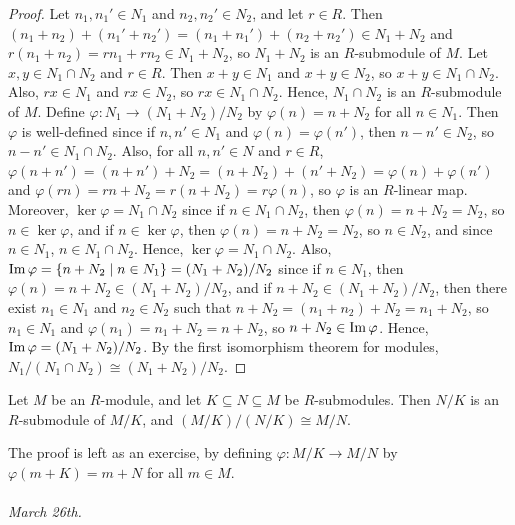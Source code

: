 \begin{proof}
    Let $n_{1},n_{1}' \in N_{1}$ and $n_{2},n_{2}' \in N_{2}$, and let $r \in R$. Then $(n_{1}+n_{2}) + (n_{1}'+n_{2}') = (n_{1}+n_{1}') + (n_{2}+n_{2}') \in N_{1} + N_{2}$ and $r(n_{1}+n_{2}) = rn_{1} + rn_{2} \in N_{1} + N_{2}$, so $N_{1} + N_{2}$ is an $R$-submodule of $M$. Let $x,y \in N_{1} \cap N_{2}$ and $r \in R$. Then $x+y \in N_{1}$ and $x+y \in N_{2}$, so $x+y \in N_{1} \cap N_{2}$. Also, $rx \in N_{1}$ and $rx \in N_{2}$, so $rx \in N_{1} \cap N_{2}$. Hence, $N_{1} \cap N_{2}$ is an $R$-submodule of $M$. Define $\varphi : N_{1} \to (N_{1}+N_{2})/N_{2}$ by $\varphi(n) = n + N_{2}$ for all $n \in N_{1}$. Then $\varphi$ is well-defined since if $n,n' \in N_{1}$ and $\varphi(n) = \varphi(n')$, then $n - n' \in N_{2}$, so $n - n' \in N_{1} \cap N_{2}$. Also, for all $n,n' \in N$ and $r \in R$, $\varphi(n+n') = (n+n') + N_{2} = (n+N_{2}) + (n'+N_{2}) = \varphi(n) + \varphi(n')$ and $\varphi(rn) = rn + N_{2} = r(n+N_{2}) = r\varphi(n)$, so $\varphi$ is an $R$-linear map. Moreover, $\ker \varphi = N_{1} \cap N_{2}$ since if $n \in N_{1} \cap N_{2}$, then $\varphi(n) = n + N_{2} = N_{2}$, so $n \in \ker \varphi$, and if $n \in \ker \varphi$, then $\varphi(n) = n + N_{2} = N_{2}$, so $n \in N_{2}$, and since $n \in N_{1}$, $n \in N_{1} \cap N_{2}$. Hence, $\ker \varphi = N_{1} \cap N_{2}$. Also, $\operatorname{Im} \varphi = \{n + N_{2} \mid n \in N_{1}\} = (N_{1}+N_{2})/N_{2}$ since if $n \in N_{1}$, then $\varphi(n) = n + N_{2} \in (N_{1}+N_{2})/N_{2}$, and if $n + N_{2} \in (N_{1}+N_{2})/N_{2}$, then there exist $n_{1} \in N_{1}$ and $n_{2} \in N_{2}$ such that $n + N_{2} = (n_{1}+n_{2}) + N_{2} = n_{1} + N_{2}$, so $n_{1} \in N_{1}$ and $\varphi(n_{1}) = n_{1} + N_{2} = n + N_{2}$, so $n + N_{2} \in \operatorname{Im} \varphi$. Hence, $\operatorname{Im} \varphi = (N_{1}+N_{2})/N_{2}$. By the first isomorphism theorem for modules, $N_{1}/(N_{1} \cap N_{2}) \cong (N_{1}+N_{2})/N_{2}$.
\end{proof}


\begin{theorem}
    Let $M$ be an $R$-module, and let $K \subseteq N \subseteq M$ be $R$-submodules. Then $N/K$ is an $R$-submodule of $M/K$, and $(M/K)/(N/K) \cong M/N$.    
\end{theorem}
The proof is left as an exercise, by defining $\varphi : M/K \to M/N$ by $\varphi(m+K) = m + N$ for all $m \in M$.
\\ \\
\noindent \textit{March 26th.}

